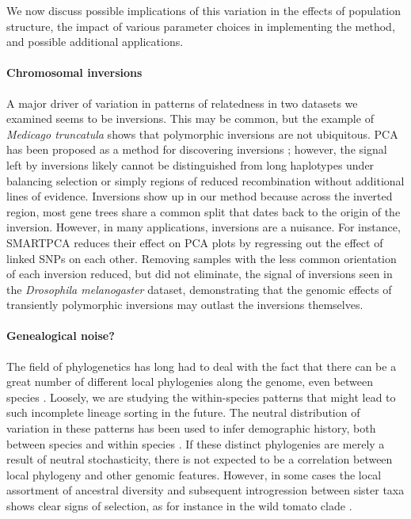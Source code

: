 \documentclass[11pt, oneside]{article}   	%
\newcommand\citep{\cite}
\renewcommand{\revpoint}[2]{\relax}
\renewcommand{\llabel}[1]{\relax}
\begin{document}
We now discuss possible implications of this variation in the effects of population structure,
the impact of various parameter choices in implementing the method,
and possible additional applications.


\paragraph{Chromosomal inversions}
A major driver of variation in patterns of relatedness in two datasets we examined seems to be inversions.
This may be common,
but the example of \textit{Medicago truncatula} shows that polymorphic inversions are not ubiquitous.
PCA has been proposed as a method for discovering inversions \citep{ma2012investigation};
however, the signal left by inversions likely cannot be distinguished from long haplotypes under balancing selection 
or simply regions of reduced recombination
without additional lines of evidence.  \llabel{ll:inversion_caveat}
Inversions show up in our method because across the inverted region,
most gene trees share a common split that dates back to the origin of the inversion.
However, in many applications, inversions are a nuisance.
For instance, SMARTPCA \citep{patterson2006population} reduces their effect on PCA plots
by regressing out the effect of linked SNPs on each other.
Removing samples with the less common orientation of each inversion reduced,
but did not eliminate, the signal of inversions
seen in the \textit{Drosophila melanogaster} dataset,
demonstrating that the genomic effects of transiently polymorphic inversions
may outlast the inversions themselves.

\paragraph{Genealogical noise?} \revpoint{AE}{6}
The field of phylogenetics has long had to deal with the fact that 
there can be a great number of different local phylogenies along the genome,
even between species
\citep{avise1983mitochondrial,pamilo1988relationships,hobolth2007genomic}.
Loosely, we are studying the within-species patterns that might lead to such
incomplete lineage sorting in the future.
The neutral distribution of variation in these patterns 
has been used to infer demographic history,
both between species \citep{slatkin2006concordance}
and within species \citep{beeravolu2018blockwise}.
If these distinct phylogenies are merely a result of neutral stochasticity,
there is not expected to be a correlation between local phylogeny
and other genomic features.
However, in some cases the local assortment of ancestral diversity 
and subsequent introgression between sister taxa
shows clear signs of selection, 
as for instance in the wild tomato clade \citep{pease2016phylogenomics}.
\end{document}
